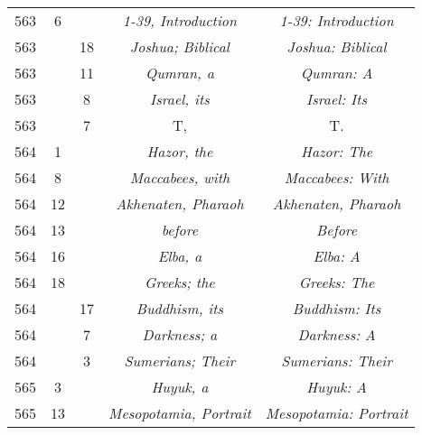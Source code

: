 \documentclass[a4paper,11pt]{article}
\begin{document}
\begin{center}
\begin{tabular}{|c|c|c|c|c|}
    563 &  6 & & \textit{1-39, Introduction}
           & \textit{1-39: Introduction} \\
    563 & & 18 & \textit{Joshua; Biblical} & \textit{Joshua: Biblical} \\
    563 & & 11 & \textit{Qumran, a} & \textit{Qumran: A} \\
    563 & &  8 & \textit{Israel, its} & \textit{Israel: Its} \\
    563 & &  7 & T, & T. \\
    564 &  1 & & \textit{Hazor, the} & \textit{Hazor: The} \\
    564 &  8 & & \textit{Maccabees, with} & \textit{Maccabees: With} \\
    564 & 12 & & \textit{Akhenaten, Pharaoh}
           & \textit{Akhenaten, Pharaoh} \\
    564 & 13 & & \textit{before} & \textit{Before} \\
    564 & 16 & & \textit{Elba, a} & \textit{Elba: A} \\
    564 & 18 & & \textit{Greeks; the} & \textit{Greeks: The} \\
    564 & & 17 & \textit{Buddhism, its} & \textit{Buddhism: Its} \\
    564 & &  7 & \textit{Darkness; a} & \textit{Darkness: A} \\
    564 & &  3 & \textit{Sumerians; Their} & \textit{Sumerians: Their} \\
    565 &  3 & & \textit{Huyuk, a} & \textit{Huyuk: A} \\
    565 & 13 & & \textit{Mesopotamia, Portrait}
           & \textit{Mesopotamia: Portrait} \\
    \hline
  \end{tabular}






\end{center}
\end{document}
